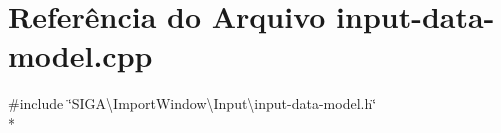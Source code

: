 \section{Referência do Arquivo input-\/data-\/model.cpp}
\label{input-data-model_8cpp}
{\ttfamily \#include \char`\"{}S\+I\+G\+A\textbackslash{}\+Import\+Window\textbackslash{}\+Input\textbackslash{}input-\/data-\/model.\+h\char`\"{}}\\*
